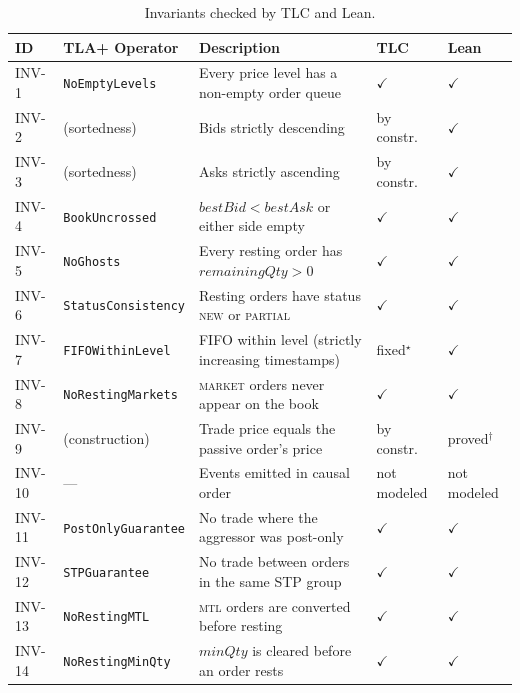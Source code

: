 \documentclass[11pt,a4paper]{article}
\begin{document}
\begin{table}[H]
\centering
\caption{Invariants checked by TLC and Lean.}
\label{tab:invariants}
\small
\begin{tabular}{@{}llL{4.8cm}ll@{}}
\toprule
ID & TLA+ Operator & Description & TLC & Lean \\
\midrule
INV-1  & \texttt{NoEmptyLevels}    & Every price level has a non-empty order queue & $\checkmark$ & $\checkmark$ \\
INV-2  & (sortedness)              & Bids strictly descending & by constr. & $\checkmark$ \\
INV-3  & (sortedness)              & Asks strictly ascending & by constr. & $\checkmark$ \\
INV-4  & \texttt{BookUncrossed}    & $\mathit{bestBid} < \mathit{bestAsk}$ or either side empty & $\checkmark$ & $\checkmark$ \\
INV-5  & \texttt{NoGhosts}         & Every resting order has $\mathit{remainingQty} > 0$ & $\checkmark$ & $\checkmark$ \\
INV-6  & \texttt{StatusConsistency}& Resting orders have status \textsc{new} or \textsc{partial} & $\checkmark$ & $\checkmark$ \\
INV-7  & \texttt{FIFOWithinLevel}  & FIFO within level (strictly increasing timestamps) & fixed$^{\star}$ & $\checkmark$ \\
INV-8  & \texttt{NoRestingMarkets} & \textsc{market} orders never appear on the book & $\checkmark$ & $\checkmark$ \\
INV-9  & (construction)            & Trade price equals the passive order's price & by constr. & proved$^{\dagger}$ \\
INV-10 & ---                       & Events emitted in causal order & not modeled & not modeled \\
INV-11 & \texttt{PostOnlyGuarantee}& No trade where the aggressor was post-only & $\checkmark$ & $\checkmark$ \\
INV-12 & \texttt{STPGuarantee}     & No trade between orders in the same STP group & $\checkmark$ & $\checkmark$ \\
INV-13 & \texttt{NoRestingMTL}     & \textsc{mtl} orders are converted before resting & $\checkmark$ & $\checkmark$ \\
INV-14 & \texttt{NoRestingMinQty}  & $\mathit{minQty}$ is cleared before an order rests & $\checkmark$ & $\checkmark$ \\
\bottomrule
\end{tabular}


\end{table}
\end{document}

